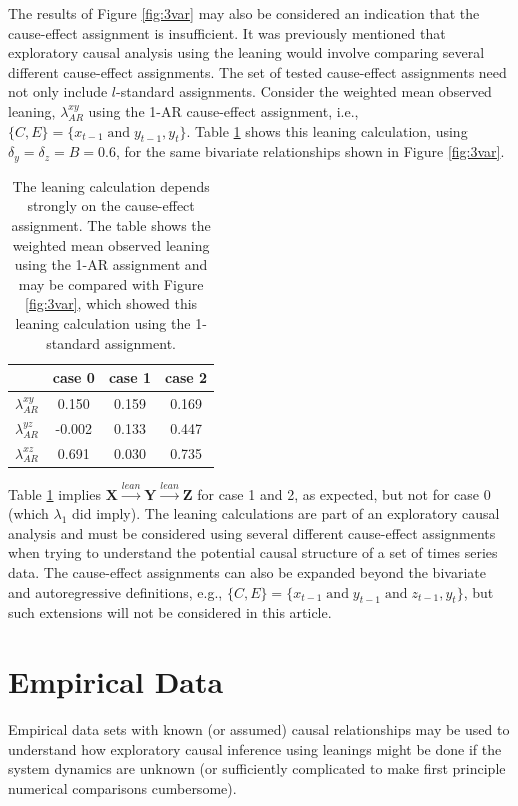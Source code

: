 \documentclass[twocolumn,aps,pre,groupedaddress]{revtex4-1}
\begin{document}
The results of Figure \ref{fig:3var} may also be considered an indication that the cause-effect assignment is insufficient.  It was previously mentioned that exploratory causal analysis using the leaning would involve comparing several different cause-effect assignments.  The set of tested cause-effect assignments need not only include $l$-standard assignments.  Consider the weighted mean observed leaning, $\lambda_{AR}^{xy}$ using the 1-AR cause-effect assignment, i.e., $\{C,E\} = \{x_{t-1}\;\mathrm{ and }\;y_{t-1},y_t\}$.  Table \ref{tab:3var} shows this leaning calculation, using $\delta_y=\delta_z=B=0.6$, for the same bivariate relationships shown in Figure \ref{fig:3var}.
\begin{table}
\begin{tabular}{lccc}
 & case 0 & case 1 & case 2\\
 \hline
 $\lambda_{AR}^{xy}$ & 0.150 & 0.159 & 0.169\\
 $\lambda_{AR}^{yz}$ & -0.002 & 0.133 & 0.447\\
 $\lambda_{AR}^{xz}$ & 0.691 & 0.030 & 0.735\\
\end{tabular}
\caption{The leaning calculation depends strongly on the cause-effect assignment.  The table shows the weighted mean observed leaning using the 1-AR assignment and may be compared with Figure \ref{fig:3var}, which showed this leaning calculation using the 1-standard assignment.}
\label{tab:3var}
\end{table}

Table \ref{tab:3var} implies $\mathbf{X}\xrightarrow{lean}\mathbf{Y}\xrightarrow{lean}\mathbf{Z}$ for case 1 and 2, as expected, but not for case 0 (which $\lambda_1$ did imply).  The leaning calculations are part of an exploratory causal analysis and must be considered using several different cause-effect assignments when trying to understand the potential causal structure of a set of times series data.  The cause-effect assignments can also be expanded beyond the bivariate and autoregressive definitions, e.g., $\{C,E\} = \{x_{t-1}\;\mathrm{ and }\;y_{t-1}\;\mathrm{ and }\;z_{t-1},y_t\}$, but such extensions will not be considered in this article.

\section{Empirical Data}
Empirical data sets with known (or assumed) causal relationships may be used to understand how exploratory causal inference using leanings might be done if the system dynamics are unknown (or sufficiently complicated to make first principle numerical comparisons cumbersome).
\end{document}
